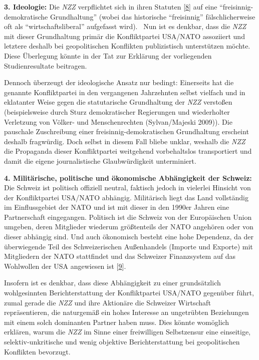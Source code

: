 \textbf{3. Ideologie:} Die \emph{NZZ} verpflichtet sich in ihren
Statuten {[}\protect\hyperlink{anm8}{8}{]} auf eine
``freisinnig-demokratische Grundhaltung'' (wobei das historische
``freisinnig'' fälschlicherweise oft als ``wirtschaftsliberal''
aufgefasst wird).~ Nun ist es denkbar, dass die \emph{NZZ} mit dieser
Grundhaltung primär die Konfliktpartei USA/NATO assoziiert und letztere
deshalb bei geopolitischen Konflikten publizistisch unterstützen möchte.
Diese Überlegung könnte in der Tat zur Erklärung der vorliegenden
Studienresultate beitragen.

Dennoch überzeugt der ideologische Ansatz nur bedingt: Einerseits hat
die genannte Konfliktpartei in den vergangenen Jahrzehnten selbst
vielfach und in eklatanter Weise gegen die statutarische Grundhaltung
der \emph{NZZ} verstoßen (beispielsweise durch Sturz demokratischer
Regierungen und wiederholter Verletzung von Völker- und Menschenrechten
(Sylvan/Majeski 2009)). Die pauschale Zuschreibung einer
freisinnig-demokratischen Grundhaltung erscheint deshalb fragwürdig.
Doch selbst in diesem Fall bliebe unklar, weshalb die \emph{NZZ} die
Propaganda dieser Konfliktpartei weitgehend vorbehaltslos transportiert
und damit die eigene journalistische Glaubwürdigkeit unterminiert.

\textbf{4. Militärische, politische und ökonomische Abhängigkeit der
Schweiz:} Die Schweiz ist politisch offiziell neutral, faktisch jedoch
in vielerlei Hinsicht von der Konfliktpartei USA/NATO abhängig.
Militärisch liegt das Land vollständig im Einflussgebiet der NATO und
ist mit dieser in den 1990er Jahren eine Partnerschaft eingegangen.
Politisch ist die Schweiz von der Europäischen Union umgeben, deren
Mitglieder wiederum größtenteils der NATO angehören oder von dieser
abhängig sind. Und auch ökonomisch besteht eine hohe Dependenz, da der
überwiegende Teil des Schweizerischen Außenhandels (Importe und Exporte)
mit Mitgliedern der NATO stattfindet und das Schweizer Finanzsystem auf
das Wohlwollen der USA angewiesen ist {[}\protect\hyperlink{anm9}{9}{]}.

Insofern ist es denkbar, dass diese Abhängigkeit zu einer grundsätzlich
wohlgesinnten Berichterstattung der Konfliktpartei USA/NATO gegenüber
führt, zumal gerade die \emph{NZZ} und ihre Aktionäre die Schweizer
Wirtschaft repräsentieren, die naturgemäß ein hohes Interesse an
ungetrübten Beziehungen mit einem solch dominanten Partner haben muss.
Dies könnte womöglich~ erklären, warum die \emph{NZZ} im Sinne einer
freiwilligen Selbstzensur eine einseitige, selektiv-unkritische und
wenig objektive Berichterstattung bei geopolitischen Konflikten
bevorzugt.


